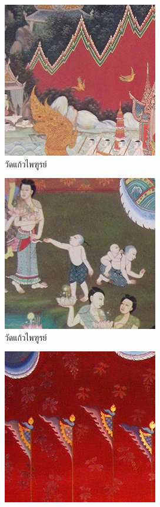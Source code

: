 \documentclass[hidelinks, a4paper,12pt]{article}
\numberwithin{equation}{section}							%
\numberwithin{equation}{section}
\begin{document}
{	\begin{figure}[H]
		\centering
		\begin{subfigure}{0.25\linewidth}
			\centering
			\includegraphics[width=0.7\linewidth]{images/thaiart/case01-original.png}
			\caption{วัดแก้วไพฑูรย์}
		\end{subfigure}
		\begin{subfigure}{0.25\linewidth}
			\centering
			\includegraphics[width=0.7\linewidth]{images/thaiart/case02-original.png}
			\caption{วัดแก้วไพฑูรย์}
		\end{subfigure}
		\begin{subfigure}{0.25\linewidth}
			\centering
			\includegraphics[width=0.7\linewidth]{images/thaiart/case03-original.png}

\end{subfigure}
\end{figure}}
\end{document}

